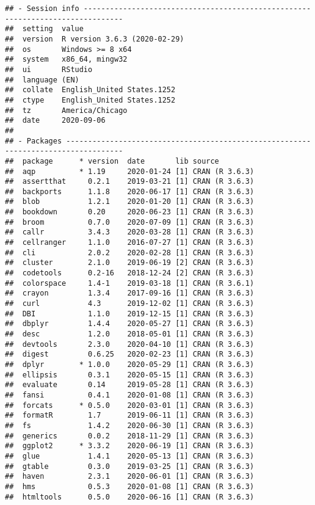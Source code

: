 \documentclass[
]{book}
\begin{document}
\begin{verbatim}
## - Session info -------------------------------------------------------------------------------
##  setting  value                       
##  version  R version 3.6.3 (2020-02-29)
##  os       Windows >= 8 x64            
##  system   x86_64, mingw32             
##  ui       RStudio                     
##  language (EN)                        
##  collate  English_United States.1252  
##  ctype    English_United States.1252  
##  tz       America/Chicago             
##  date     2020-09-06                  
## 
## - Packages -----------------------------------------------------------------------------------
##  package      * version  date       lib source        
##  aqp          * 1.19     2020-01-24 [1] CRAN (R 3.6.3)
##  assertthat     0.2.1    2019-03-21 [1] CRAN (R 3.6.3)
##  backports      1.1.8    2020-06-17 [1] CRAN (R 3.6.3)
##  blob           1.2.1    2020-01-20 [1] CRAN (R 3.6.3)
##  bookdown       0.20     2020-06-23 [1] CRAN (R 3.6.3)
##  broom          0.7.0    2020-07-09 [1] CRAN (R 3.6.3)
##  callr          3.4.3    2020-03-28 [1] CRAN (R 3.6.3)
##  cellranger     1.1.0    2016-07-27 [1] CRAN (R 3.6.3)
##  cli            2.0.2    2020-02-28 [1] CRAN (R 3.6.3)
##  cluster        2.1.0    2019-06-19 [2] CRAN (R 3.6.3)
##  codetools      0.2-16   2018-12-24 [2] CRAN (R 3.6.3)
##  colorspace     1.4-1    2019-03-18 [1] CRAN (R 3.6.1)
##  crayon         1.3.4    2017-09-16 [1] CRAN (R 3.6.3)
##  curl           4.3      2019-12-02 [1] CRAN (R 3.6.3)
##  DBI            1.1.0    2019-12-15 [1] CRAN (R 3.6.3)
##  dbplyr         1.4.4    2020-05-27 [1] CRAN (R 3.6.3)
##  desc           1.2.0    2018-05-01 [1] CRAN (R 3.6.3)
##  devtools       2.3.0    2020-04-10 [1] CRAN (R 3.6.3)
##  digest         0.6.25   2020-02-23 [1] CRAN (R 3.6.3)
##  dplyr        * 1.0.0    2020-05-29 [1] CRAN (R 3.6.3)
##  ellipsis       0.3.1    2020-05-15 [1] CRAN (R 3.6.3)
##  evaluate       0.14     2019-05-28 [1] CRAN (R 3.6.3)
##  fansi          0.4.1    2020-01-08 [1] CRAN (R 3.6.3)
##  forcats      * 0.5.0    2020-03-01 [1] CRAN (R 3.6.3)
##  formatR        1.7      2019-06-11 [1] CRAN (R 3.6.3)
##  fs             1.4.2    2020-06-30 [1] CRAN (R 3.6.3)
##  generics       0.0.2    2018-11-29 [1] CRAN (R 3.6.3)
##  ggplot2      * 3.3.2    2020-06-19 [1] CRAN (R 3.6.3)
##  glue           1.4.1    2020-05-13 [1] CRAN (R 3.6.3)
##  gtable         0.3.0    2019-03-25 [1] CRAN (R 3.6.3)
##  haven          2.3.1    2020-06-01 [1] CRAN (R 3.6.3)
##  hms            0.5.3    2020-01-08 [1] CRAN (R 3.6.3)
##  htmltools      0.5.0    2020-06-16 [1] CRAN (R 3.6.3)

\end{verbatim}
\end{document}
